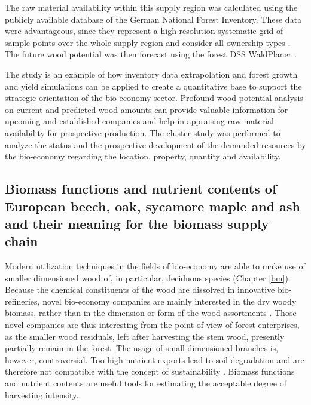 The raw material availability within this supply region was calculated using the publicly available database of the German National Forest Inventory. These data were advantageous, since they represent a high-resolution systematic grid of sample points over the whole supply region and consider all ownership types \citep{schmitz_2008}. The future wood potential was then forecast using the forest DSS WaldPlaner \citep{hansen_2014}.

The study is an example of how inventory data extrapolation and forest growth and yield simulations can be applied to create a quantitative base to support the strategic orientation of the bio-economy sector. Profound wood potential analysis on current and predicted wood amounts can provide valuable information for upcoming and established companies and help in appraising raw material availability for prospective production. The cluster study was performed to analyze the status and the prospective development of the demanded resources by the bio-economy regarding the location, property, quantity and availability.

\subsection{Biomass functions and nutrient contents of European beech, oak, sycamore maple and ash and their meaning for the biomass supply chain}
\label{subsec:intro:struct:bm}
Modern utilization techniques in the fields of bio-economy are able to make use of smaller dimensioned wood of, in particular, deciduous species (Chapter \ref{bm}). Because the chemical constituents of the wood are dissolved in innovative bio-refineries, novel bio-economy companies are mainly interested in the dry woody biomass, rather than in the dimension or form of the wood assortments \citep{ekman_2013}. Those novel companies are thus interesting from the point of view of forest enterprises, as the smaller wood residuals, left after harvesting the stem wood, presently partially remain in the forest. The usage of small dimensioned branches is, however, controversial. Too high nutrient exports lead to soil degradation and are therefore not compatible with the concept of sustainability \citep[p. 261]{pretzsch_2014}. Biomass functions and nutrient contents are useful tools for estimating the acceptable degree of harvesting intensity.

